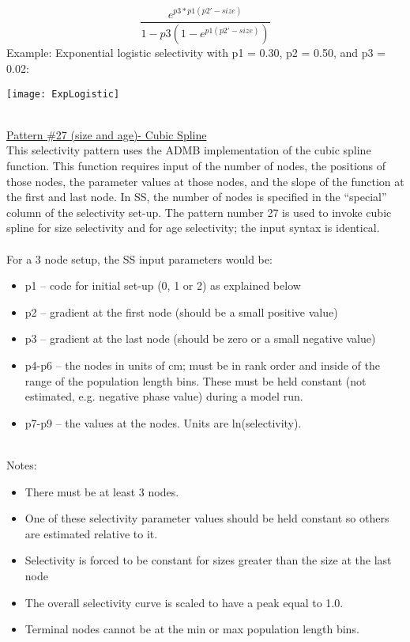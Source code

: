 \begin{equation}
	\frac{e^{p3*p1(p2'-size)}}{1-p3(1-e^{p1(p2'-size)})}
\end{equation}
Example: Exponential logistic selectivity with p1 = 0.30, p2 = 0.50, and p3 = 0.02:\\
\begin{center}
	\texttt{[image: ExpLogistic]}
\end{center}
\hfil
\\
\underline{Pattern \#27 (size and age)- Cubic Spline}\\
This selectivity pattern uses the ADMB implementation of the cubic spline function. This function requires input of the number of nodes, the positions of those nodes, the parameter values at those nodes, and the slope of the function at the first and last node.  In SS, the number of nodes is specified in the “special” column of the selectivity set-up.  The pattern number 27 is used to invoke cubic spline for size selectivity and for age selectivity; the input syntax is identical.\\
\\
For a 3 node setup, the SS input parameters would be:
\begin{itemize}
	\item p1 – 	code for initial set-up (0, 1 or 2) as explained below
	\item p2 – 	gradient at the first node (should be a small positive value)
	\item p3 – 	gradient at the last node (should be zero or a small negative value)
	\item p4-p6 – the nodes in units of cm; must be in rank order and inside of the range of the population length bins.  These must be held constant (not estimated, e.g. negative phase value) during a model run.
	\item  p7-p9 – the values at the nodes.  Units are ln(selectivity).
\end{itemize}
\hfil
\\
Notes:
\begin{itemize}
	\item There must be at least 3 nodes.
	\item One of these selectivity parameter values should be held constant so others are estimated relative to it.
	\item Selectivity is forced to be constant for sizes greater than the size at the last node
	\item The overall selectivity curve is scaled to have a peak equal to 1.0.
	\item Terminal nodes cannot be at the min or max population length bins.
\end{itemize}

